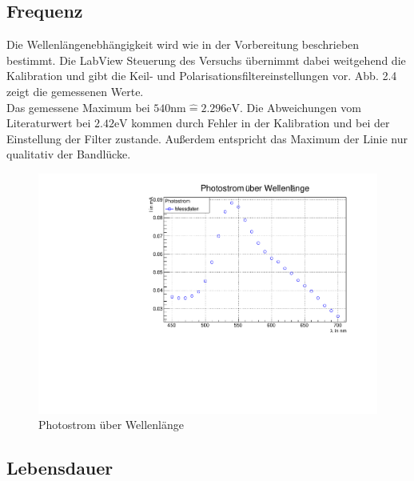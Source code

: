 \FloatBarrier

\newpage

\subsection{Frequenz}

Die Wellenlängenebhängigkeit wird wie in der Vorbereitung beschrieben bestimmt. Die LabView Steuerung des Versuchs übernimmt dabei weitgehend die Kalibration und gibt die Keil- und Polarisationsfiltereinstellungen vor.
Abb. 2.4 zeigt die gemessenen Werte.\\
Das gemessene Maximum bei $540 \text{nm} \hat{=} 2.296 \text{eV}$. Die Abweichungen vom Literaturwert bei $2.42 \text{eV}$ kommen durch Fehler in der Kalibration und bei der Einstellung der Filter zustande. Außerdem entspricht das Maximum der Linie nur qualitativ der Bandlücke.


\begin{figure}[h]
\label{A3}
\centering
\includegraphics[scale=0.5]{../A3/A3.pdf}
\caption{Photostrom über Wellenlänge}
\end{figure}


\FloatBarrier

\newpage

\subsection{Lebensdauer}

